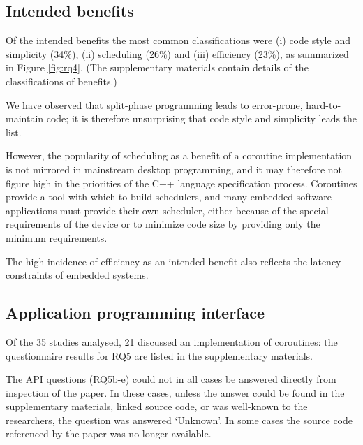 \documentclass[format=acmsmall, review=false, screen=false]{acmart}
\providecommand{\DIFadd}[1]{{\protect\color{blue}\uwave{#1}}} %
\providecommand{\DIFdel}[1]{{\protect\color{red}\sout{#1}}}                      %
\providecommand{\DIFaddbegin}{} %
\providecommand{\DIFaddend}{} %
\providecommand{\DIFdelbegin}{} %
\providecommand{\DIFdelend}{} %
\newcommand{\DIFscaledelfig}{0.5}
\newlength{\DIFdelgraphicswidth} %
\newlength{\DIFdelgraphicsheight} %
\newcommand{\DIFaddincludegraphics}[2][]{{\color{blue}\fbox{\DIFOincludegraphics[#1]{#2}}}} %
\newcommand{\DIFdelincludegraphics}[2][]{%
\sbox{\DIFdelgraphicsbox}{\DIFOincludegraphics[#1]{#2}}%
\settoboxwidth{\DIFdelgraphicswidth}{\DIFdelgraphicsbox} %
\settoboxtotalheight{\DIFdelgraphicsheight}{\DIFdelgraphicsbox} %
\scalebox{\DIFscaledelfig}{%
\parbox[b]{\DIFdelgraphicswidth}{\usebox{\DIFdelgraphicsbox}\\[-\baselineskip] \rule{\DIFdelgraphicswidth}{0em}}\llap{\resizebox{\DIFdelgraphicswidth}{\DIFdelgraphicsheight}{%
\setlength{\unitlength}{\DIFdelgraphicswidth}%
\begin{picture}(1,1)%
\thicklines\linethickness{2pt} %
{\color[rgb]{1,0,0}\put(0,0){\framebox(1,1){}}}%
{\color[rgb]{1,0,0}\put(0,0){\line( 1,1){1}}}%
{\color[rgb]{1,0,0}\put(0,1){\line(1,-1){1}}}%
\end{picture}%
}\hspace*{3pt}}} %
} %
\DeclareRobustCommand{\DIFaddbegin}{\DIFOaddbegin \let\includegraphics\DIFaddincludegraphics} %
\DeclareRobustCommand{\DIFaddend}{\DIFOaddend \let\includegraphics\DIFOincludegraphics} %
\DeclareRobustCommand{\DIFdelbegin}{\DIFOdelbegin \let\includegraphics\DIFdelincludegraphics} %
\DeclareRobustCommand{\DIFdelend}{\DIFOaddend \let\includegraphics\DIFOincludegraphics} %
\begin{document}
\subsection{Intended benefits}

Of the intended benefits the most common classifications were (i) code style and simplicity (34\%), (ii) scheduling (26\%) and (iii) efficiency (23\%), as summarized in Figure \ref{fig:rq4}. (The supplementary materials contain details of the classifications of benefits.)

We have observed that split-phase programming leads to error-prone, hard-to-maintain code; it is therefore unsurprising that code style and simplicity leads the list.

However, the popularity of scheduling as a benefit of a coroutine implementation is not mirrored in mainstream desktop programming, and it may therefore not figure high in the priorities of the C++ language specification process. Coroutines provide a tool with which to build schedulers, and many embedded software applications must provide their own scheduler, either because of the special requirements of the device \cite{Inam2011, Park2015, Susilo2009} or to minimize code size by providing only the minimum requirements.

The high incidence of efficiency as an intended benefit also reflects the latency constraints of embedded systems.

\subsection{Application programming interface}

Of the 35 studies analysed, 21 discussed an implementation of coroutines: the questionnaire results for RQ5 are listed in the supplementary materials.

The API questions (RQ5b-e) could not in all cases be answered directly from inspection of the \DIFdelbegin \DIFdel{paper}\DIFdelend \DIFaddbegin \DIFadd{papers}\DIFaddend . In these cases, unless the answer could be found in the supplementary materials, linked source code, or was well-known to the researchers, the question was answered ‘Unknown’. In some cases the source code referenced by the paper was no longer available.
\end{document}
